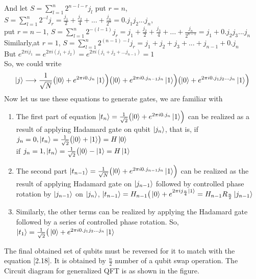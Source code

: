 And let $S= \sum_{l=1}^{n} 2^{n-l-r} j_l $
put $r=n$, $S= \sum_{l=1}^{n} 2^{-l} j_r = \frac{j_1}{2} + \frac{j_2}{4} + . . . + \frac{j_n}{2^n} = 0.j_1 j_2 . . . j_n$,\\
put $r=n-1$, $S= \sum_{l=1}^{n} 2^{-(l-1)} j_r = j_1 + \frac{j_2}{2} + \frac{j_3}{4} + . . . + \frac{j_n}{2^{n-1}} = j_1 + 0.j_2 j_3 . . . j_n$\\
Similarly,at $r=1$, $S= \sum_{l=1}^{n} 2^{(n-1)-l} j_r = j_1 + j_2  + j_3 + . . . +j_{n-1} + 0.j_n$\\
But $e^{2\pi i j_1} = e^{2\pi i (j_1 +j_2)} = e^{2\pi i (j_1 + j_2 + . . . j_{n-1})} =1 $\\
So, we could write \begin{equation} 
    \ket{j}  \longrightarrow \frac{1}{\sqrt{N}} \bigl( \ket{0} + e^{2\pi i 0.j_n } \ket{1}\Bigr) \bigl( \ket{0} + e^{2\pi i 0.j_{n-1} j_n } \ket{1}\Bigr) \bigl( \ket{0} + e^{2\pi i 0.j_1 j_2 . . . j_n } \ket{1}\Bigr)
\end{equation}
Now let us use these equations to generate gates, we are familiar with
\begin{enumerate}
 \item The first part of equation $\ket{t_n} = \frac{1}{\sqrt{2}} \bigl( \ket{0} + e^{2\pi i 0.j_n } \ket{1}\Bigr)$ can be realized as a result of applying Hadamard gate on qubit $\ket{j_n}$, 
 that is, if $j_n = 0, \ket{t_n} = \frac{1}{\sqrt{2}} \bigl( \ket{0} + \ket{1} \bigr) = H\ket{0}$
 \\if $j_n = 1, \ket{t_n} = \frac{1}{\sqrt{2}} \bigl( \ket{0} - \ket{1} = H\ket{1}$
 \item The second part $\ket{t_{n-1}} = \frac{1}{\sqrt{N}} \bigl( \ket{0} + e^{2\pi i 0.j_{n-1} j_n } \ket{1}\Bigr)$ can be realized as the result of applying Hadamard gate on $\ket{j_{n-1}}$ followed by controlled phase rotation by $\ket{j_{n-1}}$ on $\ket{j_n}$, $\ket{t_{n-1}} = H_{n-1} \bigr( \ket{0} + e^{2\pi i j_{\frac{n}{4}} \ket{1}} = H_{n-1} R_{\frac{n}{2}} \ket{j_{n-1}}$
 \item Similarly, the other terms can be realized by applying the Hadamard gate followed by a series of controlled phase rotation. So,  $\ket{t_1} = \frac{1}{\sqrt{2}} \bigr( \ket{0} + e^{ 2 \pi i 0.j_1 j_2 . . . j_n} \ket{1}$
\end{enumerate}
The final obtained set of qubits must be reversed for it to match with the equation [2.18]. It is obtained by $\frac{n}{2}$ number of a qubit swap operation. 
The Circuit diagram for generalized QFT is as shown in the figure.

